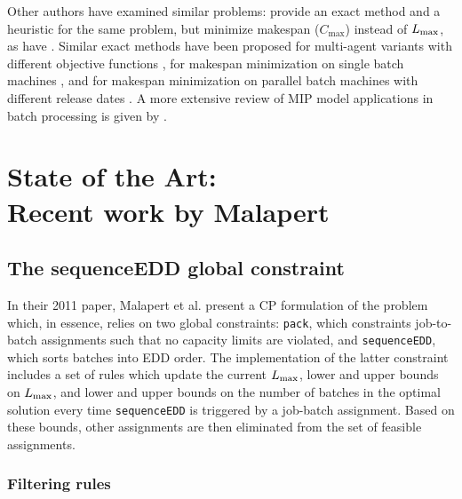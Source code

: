 \documentclass[13pt, letterpaper, oneside]{book}
\begin{document}
Other authors have examined similar problems: \citet{Azizoglu} provide an exact
method and a heuristic for the same problem, but minimize makespan
($C_\text{max}$) instead of $L_{\text{max}}$, as have \cite{Dupont}. Similar exact
methods have been proposed for multi-agent variants with different objective
functions \citep{Sabouni}, for makespan minimization on single batch machines
\citep{Kashan}, and for makespan minimization on parallel batch machines with
different release dates \citep{Ozturk}. A more extensive review of MIP model
applications in batch processing is given by \citet{Grossmann}.


\chapter[State of the Art: Recent work by Malapert]{State of the Art:\\ Recent work by Malapert}
\section{The sequenceEDD global constraint}
In their 2011 paper, Malapert et al. present a CP formulation of the problem
which, in essence, relies on two global constraints: \texttt{pack}, which
constraints job-to-batch assignments such that no capacity limits are violated,
and \texttt{sequenceEDD}, which sorts batches into EDD order. The implementation
of the latter constraint includes a set of rules which update the current
$L_{\text{max}}$, lower and upper bounds on $L_{\text{max}}$, and lower and upper bounds on the
number of batches in the optimal solution every time \texttt{sequenceEDD} is
triggered by a job-batch assignment. Based on these bounds, other assignments
are then eliminated from the set of feasible assignments.

\subsection{Filtering rules}
\end{document}
